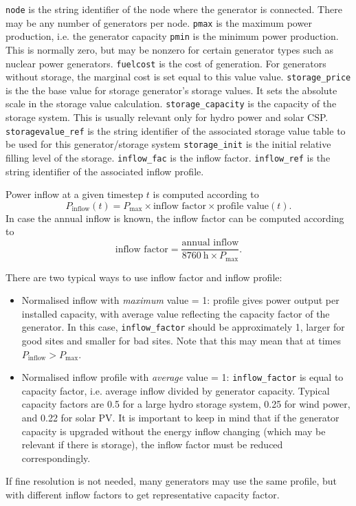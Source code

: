 \documentclass{article}
\begin{document}
\bigskip\noindent
\texttt{node} is the string identifier of the node where the generator is connected. There may be any number of generators per node.
\texttt{pmax} is the maximum power production, i.e. the generator capacity
\texttt{pmin} is the minimum power production. This is normally zero, but may be nonzero for certain generator types such as nuclear power generators.
\texttt{fuelcost} is the cost of generation. For generators without storage, the marginal cost is set equal to this value value.
\texttt{storage\_price} is the the base value for storage generator's storage values. It sets the absolute scale in the storage value calculation.
\texttt{storage\_capacity} is the capacity of the storage system. This is usually relevant only for hydro power and solar CSP.
\texttt{storagevalue\_ref} is the string identifier of the associated storage value table to be used for this generator/storage system
\texttt{storage\_init} is the initial relative filling level of the storage.
\texttt{inflow\_fac} is the inflow factor.
\texttt{inflow\_ref} is the string identifier of the associated inflow profile.

Power inflow at a given timestep $t$ is computed according to
\begin{equation}
	\label{eq:inflow}
	 P_\text{inflow}(t) =  P_\text{max} \times \text{inflow factor} \times \text{profile value}(t) .
\end{equation}
%
In case the annual inflow is known, the inflow factor can be computed according to
\begin{equation}
	\label{eq:inflow_annual}
	 \text{inflow factor} = \frac{\text{annual inflow}}{8760~\text{h} \times P_\text{max}}.
\end{equation}
%

There are two typical ways to use inflow factor and inflow profile:
\begin{itemize}
\item Normalised inflow with \emph{maximum} value = 1: profile gives power output per installed capacity, with average value reflecting the capacity factor of the generator. 
In this case, \texttt{inflow\_factor} should be approximately 1, larger for good sites and smaller for bad sites.  Note that this may mean that at times $ P_\text{inflow}>P_\text{max}$.
\item Normalised inflow profile with \emph{average} value = 1:  \texttt{inflow\_factor} is equal to capacity factor, i.e. average inflow divided by generator capacity. Typical capacity factors are  0.5 for a large hydro storage system, 0.25 for wind power, and 0.22 for solar PV.
It is important to keep in mind that if the generator capacity is upgraded without the energy inflow changing (which may be relevant if there is storage), the inflow factor must be reduced correspondingly. 
\end{itemize}
%
If fine resolution is not needed, many generators may use the same profile, but with different inflow factors to get representative capacity factor.
\end{document}
